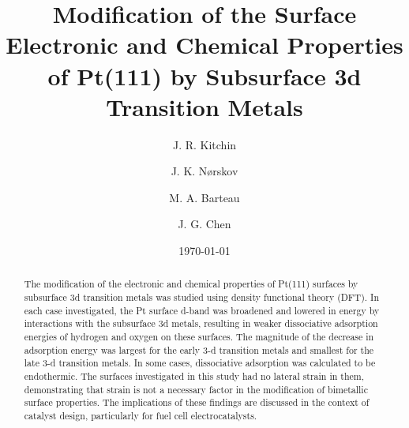 \documentclass[aps,preprint,superscriptaddress,endfloats*]{revtex4}
\begin{document}

\title{Modification of the Surface Electronic and Chemical Properties of
  Pt(111) by Subsurface 3d Transition Metals}


\author{J. R. Kitchin}

\author{J. K. N{\o}rskov}

\author{M. A. Barteau}
\author{J. G. Chen}

\date{\today}

\begin{abstract}
  The modification of the electronic and chemical properties of
  Pt(111) surfaces by subsurface 3d transition metals was studied
  using density functional theory (DFT).  In each case investigated,
  the Pt surface d-band was broadened and lowered in energy by
  interactions with the subsurface 3d metals, resulting in weaker
  dissociative adsorption energies of hydrogen and oxygen on these
  surfaces.  The magnitude of the decrease in adsorption energy was
  largest for the early 3-d transition metals and smallest for the
  late 3-d transition metals. In some cases, dissociative
  adsorption was calculated to be endothermic.  The surfaces
  investigated in this study had no lateral strain in them,
  demonstrating that strain is not a necessary factor in the
  modification of bimetallic surface properties.  The implications of
  these findings are discussed in the context of catalyst design,
  particularly for fuel cell electrocatalysts.
\end{abstract}
\end{document}

